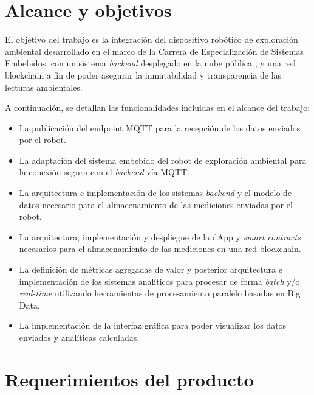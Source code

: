 
\section{Alcance y objetivos}

El objetivo del trabajo es la integración del dispositivo robótico de exploración ambiental \citep{cese_gonzalo_memoria} desarrollado en el marco de la Carrera de Especialización de Sistemas Embebidos, con un sistema \textit{backend} desplegado en la nube pública \citep{nube_publica}, y una red blockchain \cite{blockchain} a fin de poder asegurar la inmutabilidad y transparencia de las lecturas ambientales. 

A continuación, se detallan las funcionalidades incluidas en el alcance del trabajo:


\begin{itemize}
	\item La publicación del endpoint MQTT \citep{mqtt_spec} para la recepción de los datos enviados por el robot.
	\item La adaptación del sistema embebido del robot de exploración ambiental para la conexión segura con el \textit{backend} vía MQTT.
	\item La arquitectura e implementación de los sistemas \textit{backend} y el modelo de datos necesario para el almacenamiento de las mediciones enviadas por el robot.
	\item La arquitectura, implementación y despliegue de la dApp \citep{dapp} y \textit{smart contracts} \citep{smart_contracts} necesarios para el almacenamiento de las mediciones en una red blockchain.
	\item La definición de métricas agregadas de valor y posterior arquitectura e implementación de los sistemas analíticos para procesar de forma \textit{batch} y/o \textit{real-time} utilizando herramientas de procesamiento paralelo basadas en Big Data.
	\item La implementación de la interfaz gráfica para poder visualizar los datos enviados y analíticas calculadas.

\end{itemize}




\section{Requerimientos del producto}


